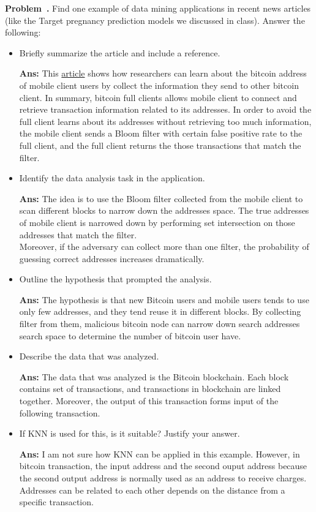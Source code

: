 \documentclass{article}
\newcounter{problem}[section]
\newenvironment{problem}[1][]{\refstepcounter{problem}\par\medskip
   \noindent \textbf{Problem~\theproblem. #1} \rmfamily}{\medskip}
\newenvironment{proof}{\begin{mdframed}\textbf{Ans:}}{ \end{mdframed}}
\begin{document}
\begin{problem}
Find one example of data mining applications in recent news articles (like the Target pregnancy prediction models we discussed in class). Answer the following:
	\begin{itemize}
		\item Briefly summarize the article and include a reference.
		\begin{proof}
			This \href{https://eprint.iacr.org/2014/763.pdf}{article} shows how researchers can learn about the bitcoin address of mobile client users by collect the information they send to other bitcoin client.
			In summary,  bitcoin full clients allows mobile client to connect and retrieve transaction information related to its addresses. In order to avoid the full client learns about its addresses without retrieving too much information, the mobile client sends a Bloom filter with certain false positive rate to the full client, and the full client returns the those transactions that match the filter. 
		\end{proof}
		\item Identify the data analysis task in the application.
		\begin{proof}
			The idea is to use the Bloom filter collected from the mobile client to scan different blocks to narrow down the addresses space. The true addresses of mobile client is narrowed down by performing set intersection on those addresses that match the filter.
			\\Moreover, if the adversary can collect more than one filter, the probability of guessing correct addresses increases dramatically.
		\end{proof}
		\item Outline the hypothesis that prompted the analysis.
		\begin{proof}
			The hypothesis is that new Bitcoin users and mobile users tends to use only few addresses, and they tend reuse it in different blocks. By collecting filter from them, malicious bitcoin node can narrow down search addresses search space to determine the number of bitcoin user have. 
		\end{proof}
		\item Describe the data that was analyzed.
		\begin{proof}
			The data that was analyzed is the Bitcoin blockchain. Each block contains set of transactions, and transactions in blockchain are linked together. Moreover, the output of this transaction forms input of the following transaction.
		\end{proof}
		\item If KNN is used for this, is it suitable? Justify your answer.
		\begin{proof}
			I am not sure how KNN can be applied in this example. However, in bitcoin transaction, the input address and the second ouput address because the second output address is normally used as an address to receive charges. Addresses can be related to each other depends on the distance from a specific transaction. 


\end{proof}
\end{itemize}
\end{problem}
\end{document}
